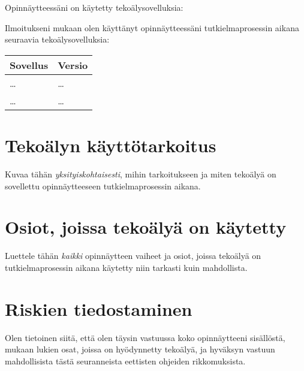 Opinnäytteessäni on käytetty tekoälysovelluksia:

\yestoai %

Ilmoitukseni mukaan olen käyttänyt opinnäytteessäni tutkielmaprosessin aikana
seuraavia tekoälysovelluksia:

\begin{center}
    \begin{tabularx}{\linewidth}{X|l}
        \toprule
        \textbf{Sovellus} & \textbf{Versio} \\
        \midrule
        \dots & \dots \\
        \dots & \dots \\
        \bottomrule
    \end{tabularx}
\end{center}

\section*{Tekoälyn käyttötarkoitus}

Kuvaa tähän \emph{yksityiskohtaisesti}, mihin tarkoitukseen ja miten tekoälyä
on sovellettu opinnäytteeseen tutkielmaprosessin aikana.

\section*{Osiot, joissa tekoälyä on käytetty}

Luettele tähän \emph{kaikki} opinnäytteen vaiheet ja osiot, joissa tekoälyä on
tutkielmaprosessin aikana käytetty niin tarkasti kuin mahdollista.

\section*{Riskien tiedostaminen}

Olen tietoinen siitä, että olen täysin vastuussa koko opinnäytteeni sisällöstä,
mukaan lukien osat, joissa on hyödynnetty tekoälyä, ja hyväksyn vastuun
mahdollisista tästä seuranneista eettisten ohjeiden rikkomuksista.

